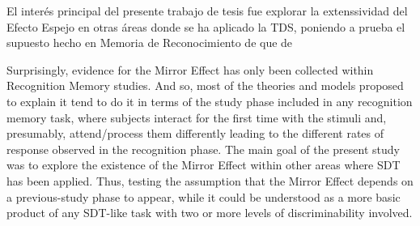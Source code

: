 El interés principal del presente trabajo de tesis fue explorar la extenssividad del Efecto Espejo en otras áreas donde se ha aplicado la TDS, poniendo a prueba el supuesto hecho en Memoria de Reconocimiento de que de


Surprisingly, evidence for the Mirror Effect has only been collected within Recognition Memory studies. And so, most of the theories and models proposed to explain it tend to do it in terms of the study phase included in any recognition memory task, where subjects interact for the first time with the stimuli and, presumably, attend/process them differently leading to the different rates of response observed in the recognition phase.
The main goal of the present study was to explore the existence of the Mirror Effect within other areas where SDT has been applied. Thus, testing the assumption that the Mirror Effect depends on a previous-study phase to appear, while it could be understood as a more basic product of any SDT-like task with two or more levels of discriminability involved.